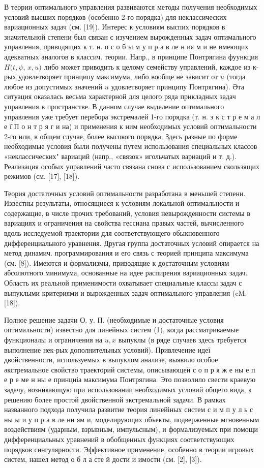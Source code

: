 \documentclass[10pt]{article}
\begin{document}
В теории оптимального управления развиваются методы получения необходимых условий высших порядков (особенно 2-го порядка) для неклассических вариационных задач (см. [19]). Интерес к условиям выспих порядков в значительной степени был связан с изучением вырожденных задач оптимального управления, приводящих к т. н. о с о б ы м у п р а в ле н ия м и не имеющих адекватных аналогов в классич. теории. Напр., в принципе Понтрягина фуункция $H(t, \psi$, $x, u)$ либо может приводить к целому семейству управлений, каждое из к-рых удовлетворяет принципу максимума, либо вообще не зависит от $u$ (тогда любое из допустимых значений $u$ удовлетворяет принципу Понтрягина). Әта ситуация оказалась весьма характерной для целого ряда прикладных задач управления в пространстве. В данном случае выделение оптимального управления уже требует перебора экстремалей 1-го порядка (т. н. э к с т р е м а л е ї̈ П о н т р я г и на) и применения к ним необходимых условий оптимальности 2-го или, в общем случае, более высокого порядка. Здесь разные по форме необходимые условия были получены путем использования специальных классов «неклассических" вариаций (напр., «связок» игольчатых вариаций и т. д.). Реализация особых управлений часто связана снова с использованием скользящих режимов (см. [17], [18]).



Теория достаточных условий оптимальности разработана в меньшей степени. Известны результаты, относящиеся к условиям локальной оптимальности и содержащие, в числе прочих требований, условия невырожденности системы в вариациях и ограничения на свойства гессиана правых частей, вычисленного вдоль исследуемой траектории для соответствующего обыкновенного дифференциального уравнения. Другая группа достаточных условий опирается на метод динамич. программирования и его связь с теорией принципа максимума (см. [8]). Имеются и формализмы, приводящие к достаточным условиям абсолютного минимума, основанные на идее распирения вариационных задач. Область их реальной применимости охватывает специальные классы задач с выпуклыми критериями и вырожденных задач оптимального управления (cM. [18]).



Полное решение задачи О. у. П. (необходимые и достаточные условия оптимальности) известно для линейных систем (1), когда рассматриваемые функционалы и ограничения на $u, x$ выпуклы (в ряде случаев здесь требуется выполнение нек-рых дополнительных условий). Привлечение идеї двойственности, используемых в выпуклом анализе, выявило особое әкстремальное свойство траекторий системы, описывающеӥ с о п р я ж е ны е п е р е ме н ны е принциіа максимума Понтрягина. Это позволило свести краевую задачу, возникающую при использовании необходимых условий общего вида, к решению более простой двойственной экстремальной задачи. В рамках названного подхода получила развитие теория линейіных систем с и м п у л ь с ны ы и у п р а в ле ни ям и, моделирующих объекты, подверженные мгновенным воздействиям (ударным, взрывным, импульсным), и формализуемых при помощи дифференциальных уравнений в обобщенных функциях соответствующих порядков сингулярности. Эффективное применение, особенно в теории игровых систем, нашел метод о б л а сте й дости и имости (см. [2], [3]).
\end{document}

